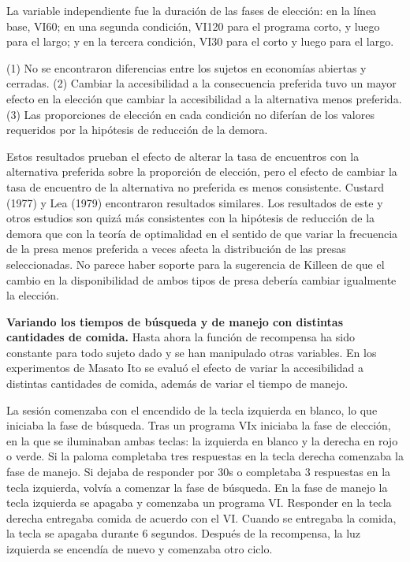\documentclass[a4paper,12pt]{article}
\begin{document}
La variable independiente fue la duración de las fases de elección: en la línea base, VI60; en una segunda condición, VI120 para el programa corto, y luego para el largo; y en la tercera condición, VI30 para el corto y luego para el largo.

(1) No se encontraron diferencias entre los sujetos en economías abiertas y cerradas. (2) Cambiar la accesibilidad a la consecuencia preferida tuvo un mayor efecto en la elección que cambiar la accesibilidad a la alternativa menos preferida. (3) Las proporciones de elección en cada condición no diferían de los valores requeridos por la hipótesis de reducción de la demora.

Estos resultados prueban el efecto de alterar la tasa de encuentros con la alternativa preferida sobre la proporción de elección, pero el efecto de cambiar la tasa de encuentro de la alternativa no preferida es menos consistente. Custard (1977) y Lea (1979) encontraron resultados similares. Los resultados de este y otros estudios son quizá más consistentes con la hipótesis de reducción de la demora que con la teoría de optimalidad en el sentido de que variar la frecuencia de la presa menos preferida a veces afecta la distribución de las presas seleccionadas. No parece haber soporte para la sugerencia de Killeen de que el cambio en la disponibilidad de ambos tipos de presa debería cambiar igualmente la elección.

{\bfseries Variando los tiempos de búsqueda y de manejo con distintas cantidades de comida.} Hasta ahora la función de recompensa ha sido constante para todo sujeto dado y se han manipulado otras variables. En los experimentos de Masato Ito se evaluó el efecto de variar la accesibilidad a distintas cantidades de comida, además de variar el tiempo de manejo.

La sesión comenzaba con el encendido de la tecla izquierda en blanco, lo que iniciaba la fase de búsqueda. Tras un programa VIx iniciaba la fase de elección, en la que se iluminaban ambas teclas: la izquierda en blanco y la derecha en rojo o verde. Si la paloma completaba tres respuestas en la tecla derecha comenzaba la fase de manejo. Si dejaba de responder por 30s o completaba 3 respuestas en la tecla izquierda, volvía a comenzar la fase de búsqueda. En la fase de manejo la tecla izquierda se apagaba y comenzaba un programa VI. Responder en la tecla derecha entregaba comida de acuerdo con el VI. Cuando se entregaba la comida, la tecla se apagaba durante 6 segundos. Después de la recompensa, la luz izquierda se encendía de nuevo y comenzaba otro ciclo. 
\end{document}
